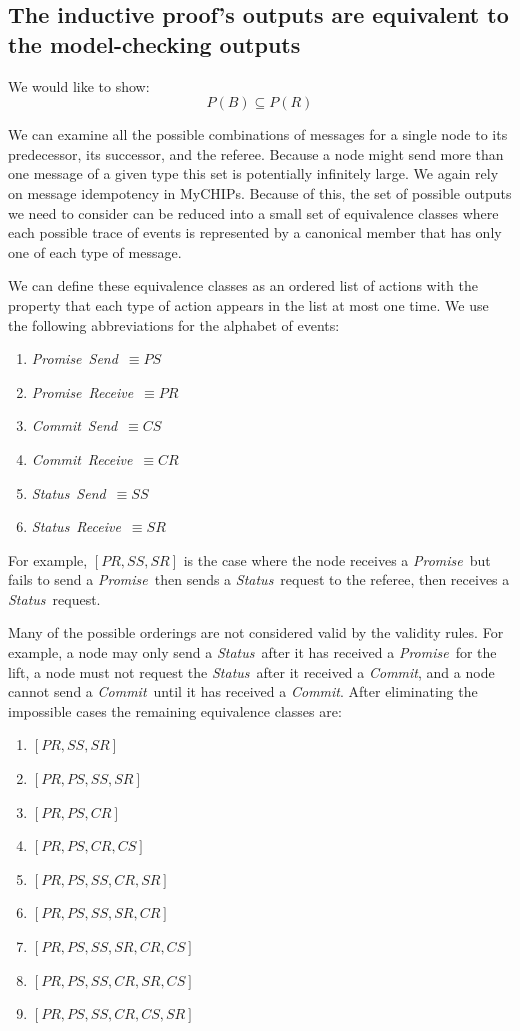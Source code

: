 \documentclass[runningheads]{llncs}
\newcommand{\send}{\emph{Send}}
\newcommand{\receive}{\emph{Receive}}
\newcommand{\promise}{\emph{Promise}}
\newcommand{\commit}{\emph{Commit}}
\newcommand{\status}{\emph{Status}}
\newif\ifcomments
\newif\ifkylecomments
\newcommand{\egm}[1]{\ifcomments\textcolor{orange}{egm: #1}\fi}
\newcommand{\krs}[1]{\ifkylecomments\textcolor{blue}{krs: #1}\fi}
\begin{document}
\subsection{The inductive proof's outputs are equivalent to the model-checking outputs}
\label{sec:outputs_bigger}
We would like to show:
$$P(B) \subseteq P(R)$$

We can examine all the possible combinations of messages for a single node to its predecessor, its successor, and the referee. Because a node might send more than one message of a given type this set is potentially infinitely large. We again rely on message idempotency in MyCHIPs. Because of this, the set of possible outputs we need to consider can be reduced into a small set of equivalence classes where each possible trace of events is represented by a canonical member that has only one of each type of message.

We can define these equivalence classes as an ordered list of actions with the property that each type of action appears in the list at most one time. 
We use the following abbreviations for the alphabet of events: 
\begin{enumerate}
    \item \promise\ \send\ $\equiv PS$ \krs{I created macros for most to use emph \egm{These need to be guarded with \emph{mathit}}}
    \item \promise\ \receive\ $\equiv PR$
    \item \commit\ \send\ $\equiv CS$
    \item \commit\ \receive\ $\equiv CR$
    \item \status\ \send\ $\equiv SS$
    \item \status\ \receive\ $\equiv SR$
\end{enumerate}
For example, $[PR, SS, SR]$ is the case where the node receives a \promise\ but fails to send a \promise\ then sends a \status\ request to the referee, then receives a \status\ request.

Many of the possible orderings are not considered valid by the validity rules. For example, a node may only send a \status\ after it has received a \promise\ for the lift, a node must not request the \status\ after it received a \commit, and a node cannot send a \commit\ until it has received a \commit. 
After eliminating the impossible cases the remaining equivalence classes are:
\begin{enumerate}
    \item $[PR, SS, SR]$
    \item $[PR, PS, SS, SR]$
    \item $[PR, PS, CR]$
    \item $[PR, PS, CR, CS]$
    \item $[PR, PS, SS, CR, SR]$
    \item $[PR, PS, SS, SR, CR]$
    \item $[PR, PS, SS, SR, CR, CS]$
    \item $[PR, PS, SS, CR, SR, CS]$
    \item $[PR, PS, SS, CR, CS, SR]$
\end{enumerate}
\end{document}
